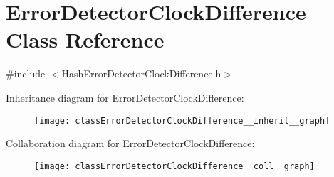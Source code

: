\hypertarget{classErrorDetectorClockDifference}{}\section{Error\+Detector\+Clock\+Difference Class Reference}
\label{classErrorDetectorClockDifference}


{\ttfamily \#include $<$Hash\+Error\+Detector\+Clock\+Difference.\+h$>$}



Inheritance diagram for Error\+Detector\+Clock\+Difference\+:\nopagebreak
\begin{figure}[H]
\begin{center}
\leavevmode
\texttt{[image: classErrorDetectorClockDifference\_\_inherit\_\_graph]}
\end{center}
\end{figure}


Collaboration diagram for Error\+Detector\+Clock\+Difference\+:\nopagebreak
\begin{figure}[H]
\begin{center}
\leavevmode
\texttt{[image: classErrorDetectorClockDifference\_\_coll\_\_graph]}
\end{center}
\end{figure}
